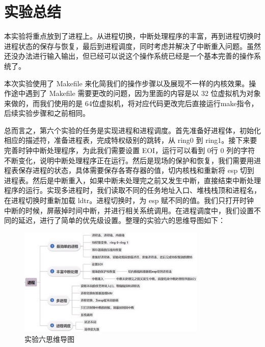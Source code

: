 \section{实验总结}
本实验将重点放到了进程上。从进程切换，中断处理程序的丰富，再到进程切换时进程状态的保存与恢复，最后到进程调度，同时考虑并解决了中断重入问题。虽然还没办法进行输入输出，但已经可以说这个操作系统已经是一个基本完善的操作系统了。\par
本次实验使用了 Makefile 来化简我们的操作步骤以及展现不一样的内核效果。操作途中遇到了 Makefile 需要更改的问题，因为里面的内容是以 32 位虚拟机为对象来做的，而我们使用的是 64位虚拟机，将对应代码更改完后直接运行make指令，后续实验步骤和之前相同。\par
总而言之，第六个实验的任务是实现进程和进程调度。首先准备好进程体，初始化相应的描述符，准备进程表，完成特权级别的跳转，从 ring0 到 ring1。接下来要完善时钟中断处理程序，为此我们需要设置 EOI，运行可以看到 0行 0 列的字符不断变化，说明中断处理程序正在运行。然后是现场的保护和恢复，我们需要用进程表保存进程的状态，具体需要保存各寄存器的值，切内核栈和重新将 esp 切到进程表。然后是中断重入，如果中断未处理完之前又发生中断，直接结束中断处理程序的运行。实现多进程时，我们读取不同的任务地址入口、堆栈栈顶和进程名，在进程切换时重新加载 ldtr。进程切换时，为 esp 赋不同的值。我们只打开时钟中断的时候，屏蔽掉时间中断，并进行相关系统调用。在进程调度中，我们设置不同的延迟，进行了简单的优先级设置。整理的实验六的思维导图如下：
\begin{figure}[H]
  \centering
  \includegraphics[width=0.8\textwidth]{figures/chapter7/7-6.jpg}
  \caption{实验六思维导图}
  \label{fig:6}
\end{figure}



